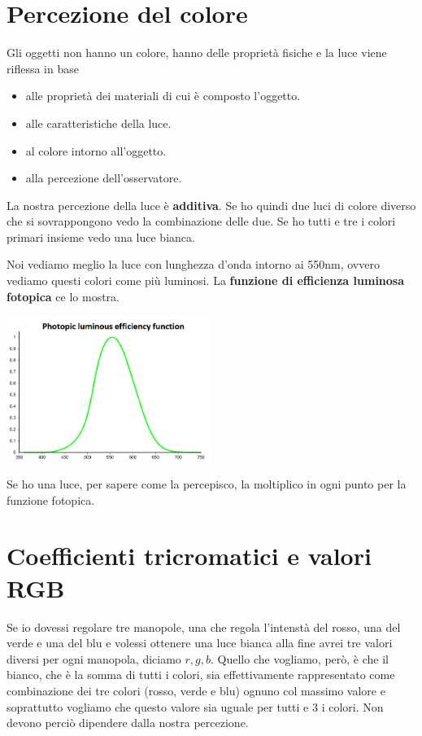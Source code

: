 \section{Percezione del colore}
Gli oggetti non hanno un colore, hanno delle propriet\`a fisiche e la luce viene riflessa in
base
\begin{itemize}
	\item alle propriet\`a dei materiali di cui \`e composto l'oggetto.
	\item alle caratteristiche della luce.
	\item al colore intorno all'oggetto.
	\item alla percezione dell'osservatore.
\end{itemize}
La nostra percezione della luce \`e \textbf{additiva}. Se ho quindi due luci di colore diverso
che si sovrappongono vedo la combinazione delle due. Se ho tutti e tre i colori primari insieme
vedo una luce bianca.

Noi vediamo meglio la luce con lunghezza d'onda intorno ai 550nm, ovvero vediamo questi colori
come pi\`u luminosi. La \textbf{funzione di efficienza luminosa fotopica} ce lo mostra.
\begin{center}
	\includegraphics[width=0.5\textwidth]{immagini/funzione_fotopica}
\end{center}
Se ho una luce, per sapere come la percepisco, la moltiplico in ogni punto per la funzione
fotopica.

\section{Coefficienti tricromatici e valori RGB}
Se io dovessi regolare tre manopole, una che regola l'intenst\`a del rosso, una del verde e
una del blu e volessi ottenere una luce bianca alla fine avrei tre valori diversi per ogni
manopola, diciamo $r, g, b$. Quello che vogliamo, per\`o, \`e che il bianco, che \`e la somma
di tutti i colori, sia effettivamente rappresentato come combinazione dei tre colori (rosso,
verde e blu) ognuno col massimo valore e soprattutto vogliamo che questo valore sia uguale
per tutti e 3 i colori. Non devono perci\`o dipendere dalla nostra percezione.

